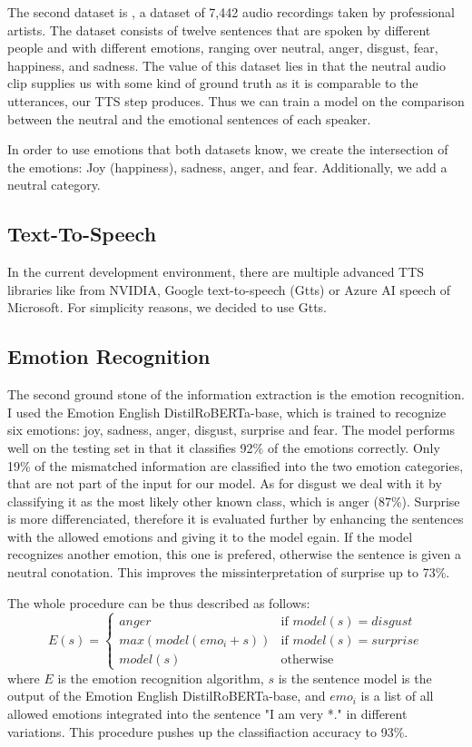 \documentclass[11pt]{article}
\begin{document}
The second dataset is \cite{cao_data}, a dataset of 7,442 audio recordings taken by professional artists. The dataset consists of twelve sentences that are spoken by different people and with different emotions, ranging over neutral, anger, disgust, fear, happiness, and sadness. The value of this dataset lies in that the neutral audio clip supplies us with some kind of ground truth as it is comparable to the utterances, our TTS step produces. Thus we can train a model on the comparison between the neutral and the emotional sentences of each speaker.

In order to use emotions that both datasets know, we create the intersection of the emotions: Joy (happiness), sadness, anger, and fear. Additionally, we add a neutral category.
\subsection{Text-To-Speech}
In the current development environment, there are multiple advanced TTS libraries like \cite{shen_natural_2018} from NVIDIA, Google text-to-speech (Gtts) or Azure AI speech of Microsoft. For simplicity reasons, we decided to use Gtts.
\subsection{Emotion Recognition}

The second ground stone of the information extraction is the emotion recognition. I used the Emotion English DistilRoBERTa-base\cite{hartmann2022emotionenglish}, which is trained to recognize six emotions: joy, sadness, anger, disgust, surprise and fear. The model performs well on the testing set in that it classifies 92\% of the emotions correctly. Only 19\% of the mismatched information are classified into the two emotion categories, that are not part of the input for our model. As for disgust we deal with it by classifying it as the most likely other known class, which is anger (87\%). Surprise is more differenciated, therefore it is evaluated further by enhancing the sentences with the allowed emotions and giving it to the model egain. If the model recognizes another emotion, this one is prefered, otherwise the sentence is given a neutral conotation. This improves the missinterpretation of surprise up to 73\%.

The whole procedure can be thus described as follows:
{
\small
\begin{equation*}
E(s)=\begin{cases}
  anger & \text{if } model(s)=disgust\\      
  max(model(emo_i+s)) & \text{if }  model(s)=surprise\\
  model(s) & \text{otherwise } 
\end{cases}
\end{equation*}
}
where $E$ is the emotion recognition algorithm, $s$ is the sentence model is the output of the Emotion English DistilRoBERTa-base, and $emo_i$ is a list of all allowed emotions integrated into the sentence "I am very *." in different variations.
This procedure pushes up the classifiaction accuracy to 93\%.
\end{document}

